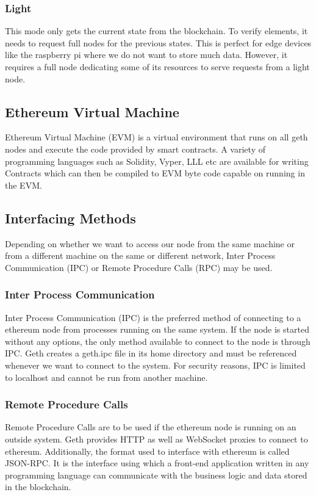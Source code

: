 \documentclass[11pt,openright]{report}
\begin{document}
\subsubsection{Light}
This mode only gets the current state from the blockchain. To verify elements, it needs to request full nodes for the previous states. This is perfect for edge devices like the raspberry pi where we do not want to store much data. However, it requires a full node dedicating some of its resources to serve requests from a light node.

\subsection{Ethereum Virtual Machine}
Ethereum Virtual Machine (EVM) is a virtual environment that runs on all geth nodes and execute the code provided by smart contracts. A variety of programming languages such as Solidity, Vyper, LLL etc are available for writing Contracts which can then be compiled to EVM byte code capable on running in the EVM.

\subsection{Interfacing Methods}
Depending on whether we want to access our node from the same machine or from a different machine on the same or different network, Inter Process Communication (IPC) or Remote Procedure Calls (RPC) may be used.

\subsubsection{Inter Process Communication}
Inter Process Communication (IPC) is the preferred method of connecting to a ethereum node from processes running on the same system. If the node is started without any options, the only method available to connect to the node is through IPC. Geth creates a geth.ipc file in its home directory and must be referenced whenever we want to connect to the system. For security reasons, IPC is limited to localhost and cannot be run from another machine.

\subsubsection{Remote Procedure Calls}
Remote Procedure Calls are to be used if the ethereum node is running on an outside system. Geth provides HTTP as well as WebSocket proxies to connect to ethereum. Additionally, the format used to interface with ethereum is called JSON-RPC. It is the interface using which a front-end application written in any programming language can communicate with the business logic and data stored in the blockchain.
\end{document}
